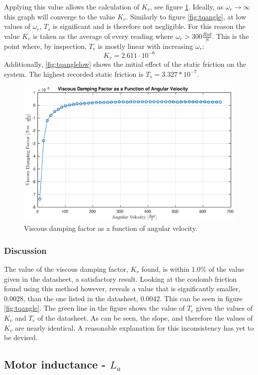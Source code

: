 Applying this value allows the calculation of $K_v$, see figure \ref{fig:visvel}.
Ideally, as $\omega_r\rightarrow \infty$ this graph will converge to the value $K_v$. 
Similarly to figure \ref{fig:tqangle}, at low values of $\omega_r$, $T_s$ is significant and is therefore not negligible.
For this reason the value $K_v$ is taken as the average of every reading where $\omega_r>300\frac{Rad}{S}$. 
This is the point where, by inspection, $T_e$ is mostly linear with increasing $\omega_r$:
$$K_v=2.611\cdot 10^{-6}$$
Additionally, \ref{fig:tqanglelow} shows the initial effect of the static friction on the system.
The highest recorded static friction is $T_s=3.327*10^{-7}$.
\begin{figure}[!h]
	\centering
	\includegraphics[width=.75\linewidth]{graphics/visvel}
	\caption{Viscous damping factor as a function of angular velocity.}
	\label{fig:visvel}
\end{figure}
\subsubsection{Discussion}
The value of the viscous damping factor, $K_v$ found, is within 1.0\% of the value given in the datasheet, a satisfactory result.
Looking at the coulomb friction found using this method however, reveals a value that is significantly smaller, 0.0028, than the one listed in the datasheet, 0.0042.
This can be seen in figure \ref{fig:tqangle}. 
The green line in the figure shows the value of $T_e$ given the values of $K_v$ and $T_c$ of the datasheet.
As can be seen, the slope, and therefore the values of $K_v$ are nearly identical.
A reasonable explanation for this inconsistency has yet to be devised.

\subsection{Motor inductance - $L_a$}
